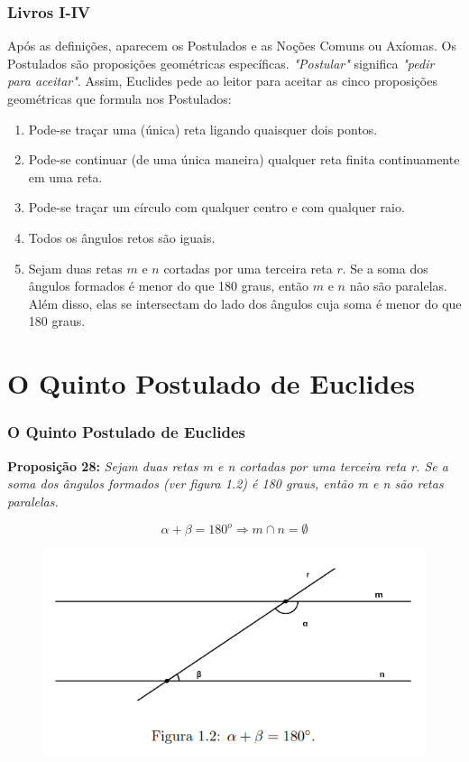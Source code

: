 \begin{frame}
    \frametitle{Livros I-IV}
    \justifying
    Após as definições, aparecem os Postulados e as Noções Comuns ou Axíomas. Os Postulados são proposições geométricas específicas. \textit{"Postular"} significa \textit{"pedir para aceitar"}. Assim, Euclides pede ao leitor para aceitar as cinco proposições geométricas que formula nos Postulados:
    \vspace{3mm}
    
    \begin{enumerate}
        \item Pode-se traçar uma (única) reta ligando quaisquer dois pontos.
        \item Pode-se continuar (de uma única maneira) qualquer reta finita continuamente em uma reta.
        \item Pode-se traçar um círculo com qualquer centro e com qualquer raio.
        \item Todos os ângulos retos são iguais.
        \item Sejam duas retas $m$ e $n$ cortadas por uma terceira reta $r$. Se a soma dos ângulos formados é menor do que 180 graus, então $m$ e $n$ não são paralelas. Além disso, elas se intersectam do lado dos ângulos cuja soma é menor do que 180 graus.
    \end{enumerate}
\end{frame}

\section{O Quinto Postulado de Euclides}
\begin{frame}
    \frametitle{O Quinto Postulado de Euclides}

    \textbf{Proposição 28:} \textit{Sejam duas retas m e n cortadas por uma terceira reta r. Se a soma dos ângulos formados (ver figura 1.2) é 180 graus, então m e n são retas paralelas.}

    \begin{equation}
        \alpha + \beta = 180^o \Rightarrow m \cap n = \emptyset
    \end{equation}

    \begin{figure}[h!]
        \centering
        \includegraphics[scale=0.55]{img/retas_paralelas.png}
    \end{figure}
\end{frame}

